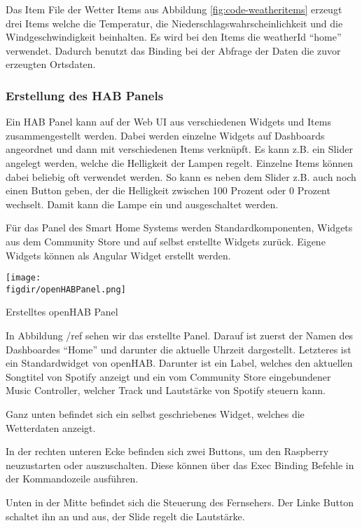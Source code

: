 		Das Item File der Wetter Items aus Abbildung \ref{fig:code-weatheritems} erzeugt drei Items welche die Temperatur, die Niederschlagswahrscheinlichkeit und die Windgeschwindigkeit beinhalten.
		Es wird bei den Items die weatherId "`home"' verwendet. Dadurch benutzt das Binding bei der Abfrage der Daten die zuvor erzeugten Ortsdaten.
		
		\subsubsection{Erstellung des HAB Panels}
		Ein HAB Panel kann auf der Web UI aus verschiedenen Widgets und Items zusammengestellt werden. Dabei werden einzelne Widgets auf Dashboards angeordnet und dann mit verschiedenen Items verknüpft. Es kann z.B. ein Slider angelegt werden, welche die Helligkeit der Lampen regelt. Einzelne Items können dabei beliebig oft verwendet werden. So kann es neben dem Slider z.B. auch noch einen Button geben, der die Helligkeit zwischen 100 Prozent oder 0 Prozent wechselt. Damit kann die Lampe ein und ausgeschaltet werden.
		
		Für das Panel des Smart Home Systems werden Standardkomponenten, Widgets aus dem Community Store und auf selbst erstellte Widgets zurück. Eigene Widgets können als Angular Widget erstellt werden.
		
	\begin{minipage}{\textwidth}
		\centering
		\captionsetup{type=figure}
		\texttt{[image: \\figdir/openHABPanel.png]}
		\caption{Erstelltes openHAB Panel \label{fig:activity-diagram}}
	\end{minipage}
		
		In Abbildung /ref{} sehen wir das erstellte Panel. Darauf ist zuerst der Namen des Dashboardes "`Home"' und darunter die aktuelle Uhrzeit dargestellt. Letzteres ist ein Standardwidget von openHAB.
		Darunter ist ein Label, welches den aktuellen Songtitel von Spotify anzeigt und ein vom Community Store eingebundener Music Controller, welcher Track und Lautstärke von Spotify steuern kann.

		Ganz unten befindet sich ein selbst geschriebenes Widget, welches die Wetterdaten anzeigt.

		In der rechten unteren Ecke befinden sich zwei Buttons, um den Raspberry neuzustarten oder auszuschalten. Diese können über das Exec Binding Befehle in der Kommandozeile ausführen.
		
		Unten in der Mitte befindet sich die Steuerung des Fernsehers. Der Linke Button schaltet ihn an und aus, der Slide regelt die Lautstärke.
		
